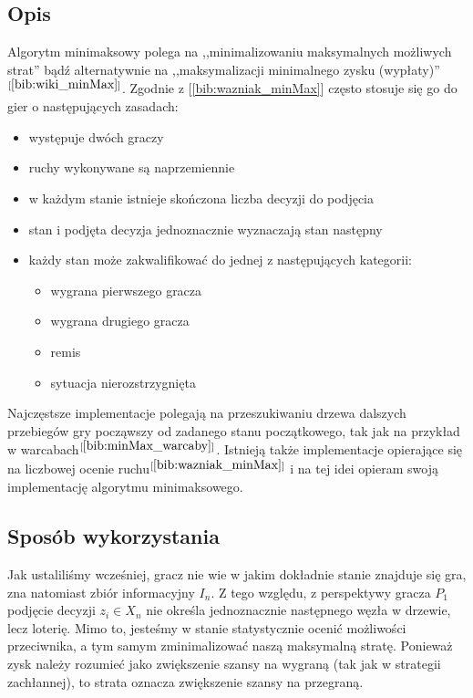 \subsection{Opis}
Algorytm minimaksowy polega na ,,minimalizowaniu maksymalnych możliwych strat'' bądź alternatywnie na ,,maksymalizacji minimalnego zysku (wypłaty)''$^{[\ref{bib:wiki_minMax}]}$. Zgodnie z [\ref{bib:wazniak_minMax}] często stosuje się go do gier o następujących zasadach:
\begin{itemize}
	\item występuje dwóch graczy
	\item ruchy wykonywane są naprzemiennie
	\item w każdym stanie istnieje skończona liczba decyzji do podjęcia
	\item stan i podjęta decyzja jednoznacznie wyznaczają stan następny
	\item każdy stan może zakwalifikować do jednej z następujących kategorii:
	\begin{itemize}
		\item wygrana pierwszego gracza
		\item wygrana drugiego gracza
		\item remis
		\item sytuacja nierozstrzygnięta
	\end{itemize}
\end{itemize}
Najczęstsze implementacje polegają na przeszukiwaniu drzewa dalszych przebiegów gry począwszy od zadanego stanu początkowego, tak jak na przykład w warcabach$^{[\ref{bib:minMax_warcaby}]}$. Istnieją także implementacje opierające się na liczbowej ocenie ruchu$^{[\ref{bib:wazniak_minMax}]}$ i na tej idei opieram swoją implementację algorytmu minimaksowego.

\subsection{Sposób wykorzystania}
Jak ustaliliśmy wcześniej, gracz nie wie w jakim dokładnie stanie znajduje się gra, zna natomiast zbiór informacyjny $I_n$. Z tego względu, z perspektywy gracza $P_1$ podjęcie decyzji $z_i \in X_n$ nie określa jednoznacznie następnego węzła w drzewie, lecz loterię. Mimo to, jesteśmy w stanie statystycznie ocenić możliwości przeciwnika, a tym samym zminimalizować naszą maksymalną stratę. Ponieważ zysk należy rozumieć jako zwiększenie szansy na wygraną (tak jak w strategii zachłannej), to strata oznacza zwiększenie szansy na przegraną. 


